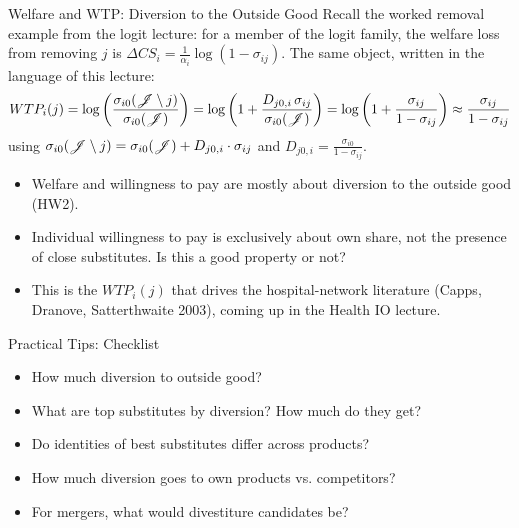 \documentclass[aspectratio=169,10pt]{beamer}
\begin{document}
\begin{frame}{Welfare and WTP: Diversion to the Outside Good}
Recall the worked removal example from the logit lecture: for a member of the logit family, the welfare loss from removing $j$ is $\Delta CS_i = \frac{1}{\alpha_i}\log(1-\sigma_{ij})$. The same object, written in the language of this lecture:
\begin{align*}
WTP_i(j) = \log \left( \frac{\sigma_{i0}(\mathscr{J}\setminus j) }{\sigma_{i0}(\mathscr{J}) }\right)
=\log \left( 1+\frac{D_{j0,i}\, \sigma_{ij}}{\sigma_{i0}(\mathscr{J}) }\right)
=\log \left( 1+\frac{\sigma_{ij}}{1-\sigma_{ij}  }\right)
\approx \frac{\sigma_{ij}}{1-\sigma_{ij} }
\end{align*}
using $\sigma_{i0}(\mathscr{J}\setminus j) = \sigma_{i0}(\mathscr{J}) + D_{j0,i} \cdot \sigma_{ij}$ and $D_{j0,i} = \frac{\sigma_{i0}}{1-\sigma_{ij}}$.
\begin{itemize}
\item Welfare and willingness to pay are mostly about \alert{diversion to the outside good} (HW2).
\item Individual willingness to pay is exclusively about \alert{own share}, not the presence of close substitutes. Is this a good property or not?
\item This is the $WTP_i(j)$ that drives the hospital-network literature (Capps, Dranove, Satterthwaite 2003), coming up in the Health IO lecture.
\end{itemize}
\end{frame}

\begin{frame}{Practical Tips: Checklist}
\begin{itemize}
\item How much diversion to outside good?
\item What are top substitutes by diversion? How much do they get?
\item Do identities of best substitutes differ across products?
\item How much diversion goes to own products vs. competitors?
\item For mergers, what would \alert{divestiture} candidates be?
\end{itemize}
\end{frame}
\end{document}
